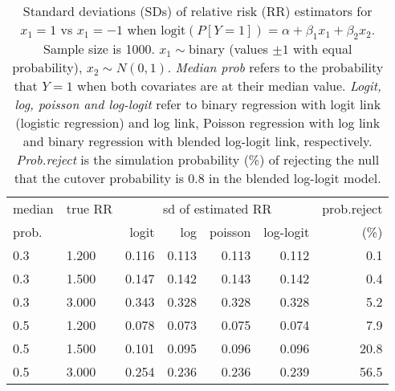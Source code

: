 \documentclass[12pt,a4paper]{article}
\begin{document}
\begin{table}[H] 
\small\sf\centering 
\caption{Standard deviations (SDs) of relative risk (RR) estimators for $x_1=1$ vs $x_1=-1$ when $\mbox{logit}(P[Y=1])=\alpha+\beta_1 x_1 + \beta_2 x_2$. Sample size is 1000. $x_1 \sim $binary (values $\pm 1$ with equal probability), $x_2 \sim N(0,1)$. {\it Median prob} refers to the probability that $Y=1$ when both covariates are at their median value. {\it Logit, log, poisson and log-logit} refer to binary regression with logit link (logistic regression) and log link, Poisson regression with log link and binary regression with blended log-logit link, respectively. {\it Prob.reject} is the simulation probability (\%) of rejecting the null that the cutover probability is $0.8$ in the blended log-logit model.} 
\begin{tabular}{llrrrrr} 
\toprule 
median & true RR & \multicolumn{4}{c}{sd of estimated RR} & prob.reject \\ 
prob. & & logit & log & poisson & log-logit  & (\%) \\ \midrule 
0.3 & 1.200 & 0.116 & 0.113 & 0.113 & 0.112 &  0.1 \\  
0.3 & 1.500 & 0.147 & 0.142 & 0.143 & 0.142 &  0.4 \\  
0.3 & 3.000 & 0.343 & 0.328 & 0.328 & 0.328 &  5.2 \\  
0.5 & 1.200 & 0.078 & 0.073 & 0.075 & 0.074 &  7.9 \\  
0.5 & 1.500 & 0.101 & 0.095 & 0.096 & 0.096 & 20.8 \\  
0.5 & 3.000 & 0.254 & 0.236 & 0.236 & 0.239 & 56.5 \\  
\bottomrule 
\end{tabular} 
\end{table} 
\end{document}
